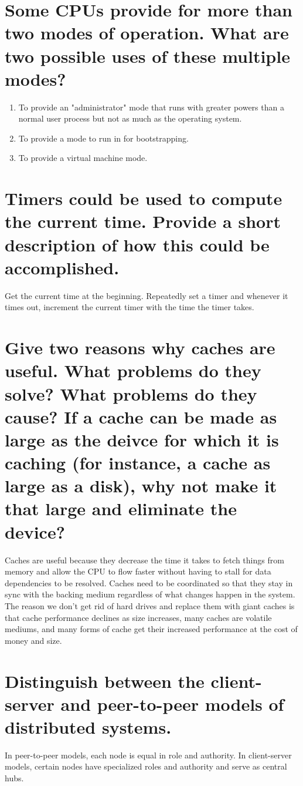 \documentclass{book}%
\begin{document}
\section{Some CPUs provide for more than two modes of operation. What are two 
possible uses of these multiple modes?}
\begin{enumerate}
\item To provide an "administrator" mode that runs with greater powers than a 
normal user process but not as much as the operating system.
\item To provide a mode to run in for bootstrapping.
\item To provide a virtual machine mode.
\end{enumerate}
\section{Timers could be used to compute the current time. Provide a short 
description of how this could be accomplished.}
Get the current time at the beginning. Repeatedly set a timer and whenever it 
times out, increment the current timer with the time the timer takes.
\section{Give two reasons why caches are useful. What problems do they solve? 
What problems do they cause? If a cache can be made as large as the deivce for 
which it is caching (for instance, a cache as large as a disk), why not make it 
that large and eliminate the device?}
Caches are useful because they decrease the time it takes to fetch things from 
memory and allow the CPU to flow faster without having to stall for data 
dependencies to be resolved. Caches need to be coordinated so that they stay in 
sync with the backing medium regardless of what changes happen in the system. 
The reason we don't get rid of hard drives and replace them with giant caches is
that cache performance declines as size increases, many caches are volatile 
mediums, and many forms of cache get their increased performance at the cost of 
money and size.
\section{Distinguish between the client-server and peer-to-peer models of 
distributed systems.}
In peer-to-peer models, each node is equal  in role and authority. In 
client-server models, certain nodes have specialized roles and authority and 
serve as central hubs.
\end{document}
